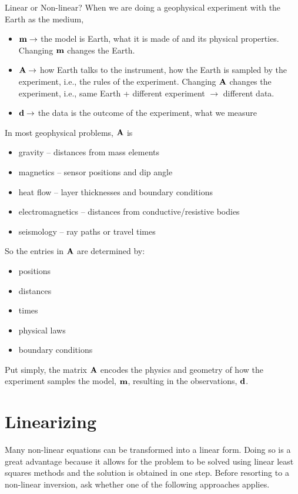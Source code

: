 \begin{activity}{Linear or Non-linear?}
When we are doing a geophysical experiment with the Earth as the medium,
\begin{itemize}
  \item \(\vb{m} \to \) the model is Earth, what it is made of and its physical properties. Changing \(\vb{m}\) changes the Earth.
  \item \(\vb{A} \to \) how Earth talks to the instrument, how the Earth is sampled by the experiment, i.e., the rules of the experiment. Changing \(\vb{A}\) changes the experiment, i.e., same Earth + different experiment \(\to\) different data.
  \item \(\vb{d} \to \) the data is the outcome of the experiment, what we measure
\end{itemize}

In most geophysical problems, \(\vb{A}\) is
\begin{itemize}
  \item gravity -- distances from mass elements
  \item magnetics -- sensor positions and dip angle
  \item heat flow -- layer thicknesses and boundary conditions
  \item electromagnetics -- distances from conductive/resistive bodies
  \item seismology -- ray paths or travel times
\end{itemize}
So the entries in \(\vb{A}\) are determined by:
\begin{itemize}
  \item positions
  \item distances
  \item times
  \item physical laws
  \item boundary conditions
\end{itemize}

Put simply, the matrix \(\vb{A}\) encodes the physics and geometry of how the experiment samples the model, \(\vb{m}\), resulting in the observations, \(\vb{d}\).

\section*{Linearizing}

Many non-linear equations can be transformed into a linear form. Doing so is a great advantage because it allows for the problem to be solved using linear least squares methods and the solution is obtained in one step. Before resorting to a non-linear inversion, ask whether one of the following approaches applies.


\end{activity}
